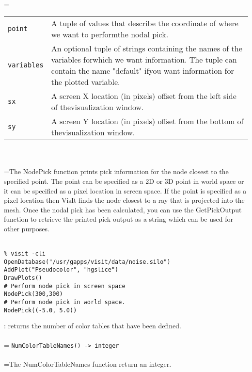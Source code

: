 \documentclass[10pt,a4paper]{report}
\begin{document}
 \\ 
\hangindent=\parindent 
\begin{tabular}{lp{9cm}}
\verb!point! & A tuple of values that describe the coordinate of where we want to performthe nodal pick. \\
\verb!variables! & An optional tuple of strings containing the names of the variables forwhich we want information. The tuple can contain the name "default" ifyou want information for the plotted variable. \\
\verb!sx! & A screen X location (in pixels) offset from the left side of thevisualization window. \\
\verb!sy! & A screen Y location (in pixels) offset from the bottom of thevisualization window. \\
\end{tabular} \\[-2mm]


 \\ 
\hangindent=\parindent The NodePick function prints pick information for the node closest to the specified point. The point can be specified as a 2D or 3D point in world space or it can be specified as a pixel location in screen space. If the point is specified as a pixel location then VisIt finds the node closest to a ray that is projected into the mesh. Once the nodal pick has been calculated, you can use the GetPickOutput function to retrieve the printed pick output as a string which can be used for other purposes. \\[-3mm] 

\\[-6mm]
\begin{verbatim}% visit -cli
OpenDatabase("/usr/gapps/visit/data/noise.silo")
AddPlot("Pseudocolor", "hgslice")
DrawPlots()
# Perform node pick in screen space
NodePick(300,300)
# Perform node pick in world space.
NodePick((-5.0, 5.0))
\end{verbatim}
\newpage


{}
: returns the number of color tables that have been defined.\\[-3mm]

 \\ 
\hangindent=\parindent 
\verb!NumColorTableNames() -> integer!\\ [-3mm]

 \\ 
\hangindent=\parindent The NumColorTableNames function return an integer. \\[-3mm] 
\end{document}
